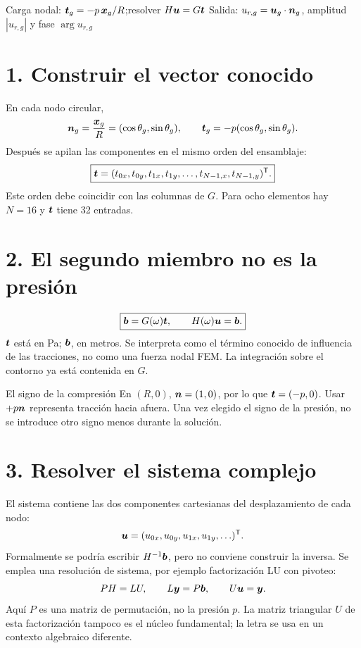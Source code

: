 \documentclass[11pt]{article}
\begin{document}
\base
{}
{Carga nodal: \(\bm{t}_g=-p\,\bm{x}_g/R\);\quad resolver \(H\bm{u}=G\bm{t}\)}
{Salida: \(u_{r,g}=\bm{u}_g\cdot\bm{n}_g\), amplitud \(|u_{r,g}|\) y fase \(\arg u_{r,g}\)}

\section*{1. Construir el vector conocido}
En cada nodo circular,
\[
 \bm{n}_g=\frac{\bm{x}_g}{R}=(\cos\theta_g,\sin\theta_g),\qquad
 \bm{t}_g=-p(\cos\theta_g,\sin\theta_g).
\]
Después se apilan las componentes en el mismo orden del ensamblaje:
\[
 \boxed{\bm{t}=
 (t_{0x},t_{0y},t_{1x},t_{1y},\ldots,t_{N-1,x},t_{N-1,y})^{\mathsf T}.}
\]
Este orden debe coincidir con las columnas de \(G\). Para ocho elementos
hay \(N=16\) y \(\bm{t}\) tiene 32 entradas.

\section*{2. El segundo miembro no es la presión}
\[
 \boxed{\bm{b}=G(\omega)\bm{t},\qquad H(\omega)\bm{u}=\bm{b}.}
\]
\(\bm{t}\) está en Pa; \(\bm{b}\), en metros. Se interpreta como el término
conocido de influencia de las tracciones, no como una fuerza nodal FEM.
La integración sobre el contorno ya está contenida en \(G\).

\begin{alerta}{El signo de la compresión}
En \((R,0)\), \(\bm{n}=(1,0)\), por lo que
\(\bm{t}=(-p,0)\). Usar \(+p\bm{n}\) representa tracción hacia afuera.
Una vez elegido el signo de la presión, no se introduce otro signo menos
durante la solución.
\end{alerta}

\newpage
\section*{3. Resolver el sistema complejo}
El sistema contiene las dos componentes cartesianas del desplazamiento de
cada nodo:
\[
 \bm{u}=(u_{0x},u_{0y},u_{1x},u_{1y},\ldots)^{\mathsf T}.
\]
Formalmente se podría escribir \(H^{-1}\bm{b}\), pero no conviene construir
la inversa. Se emplea una resolución de sistema, por ejemplo factorización
LU con pivoteo:
\[
 PH=LU,\qquad L\bm{y}=P\bm{b},\qquad U\bm{u}=\bm{y}.
\]
Aquí \(P\) es una matriz de permutación, no la presión \(p\).
La matriz triangular \(U\) de esta factorización tampoco es el núcleo
fundamental; la letra se usa en un contexto algebraico diferente.
\end{document}
